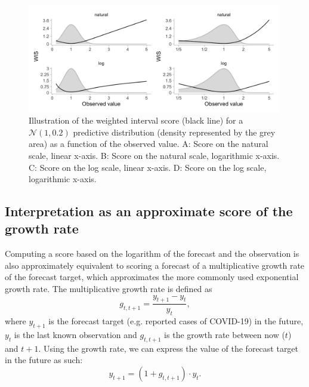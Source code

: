 \documentclass{article}
\begin{document}
\begin{figure}[h!]
    \centering
    \includegraphics[width=0.99\textwidth]{output/figures/SIM-effect-log-score.png}
    \caption{Illustration of the weighted interval score (black line) for a $\mathcal{N}(1, 0.2)$ predictive distribution (density represented by the grey area) as a function of the observed value. A: Score on the natural scale, linear x-axis. B: Score on the natural scale, logarithmic x-axis. C: Score on the log scale, linear x-axis. D: Score on the log scale, logarithmic x-axis.} 
    \label{fig:change-in-scores}
\end{figure}





\subsection{Interpretation as an approximate score of the growth rate}

Computing a score based on the logarithm of the forecast and the observation is also approximately equivalent to scoring a forecast of a multiplicative growth rate of the forecast target, which approximates the more commonly used exponential growth rate. The multiplicative growth rate is defined as
%
\begin{equation}
    g_{t, t+1} = \frac{y_{t+1} - y_t}{y_t},
\end{equation}
%
where $y_{t+1}$ is the forecast target (e.g. reported cases of COVID-19) in the future, $y_t$ is the last known observation and $g_{t, t+1}$ is the growth rate between now ($t$) and $t+1$. 
Using the growth rate, we can express the value of the forecast target in the future as such: 
%
\begin{equation}
y_{t+1} = (1 + g_{t, t+1}) \cdot y_t.
\end{equation}
%
\end{document}
